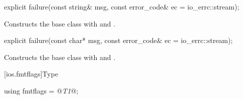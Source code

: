 %
\begin{itemdecl}
explicit failure(const string& msg, const error_code& ec = io_errc::stream);
\end{itemdecl}

\begin{itemdescr}
\pnum
\effects
Constructs the base class with  and .
\end{itemdescr}

%
\begin{itemdecl}
explicit failure(const char* msg, const error_code& ec = io_errc::stream);
\end{itemdecl}

\begin{itemdescr}
\pnum
\effects
Constructs the base class with  and .
\end{itemdescr}

[ios.fmtflags]{Type }

%
\begin{itemdecl}
using fmtflags = @\textit{T1}@;
\end{itemdecl}


